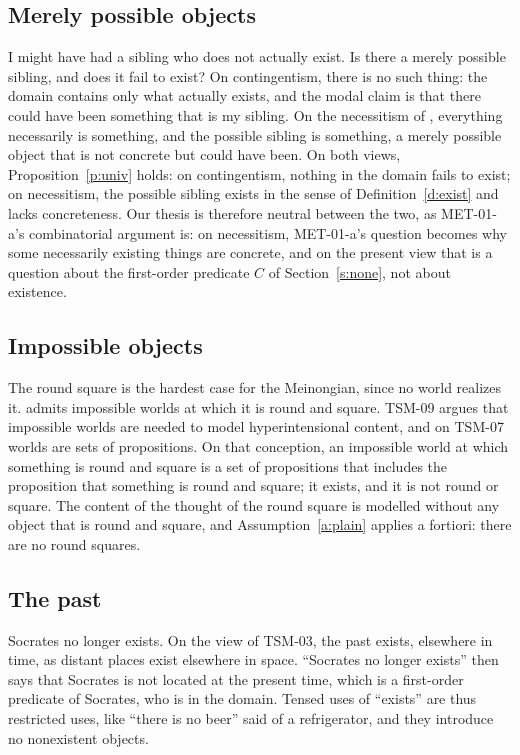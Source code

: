\documentclass{situationist-preprint}
\begin{document}
\subsection{Merely possible objects}

I might have had a sibling who does not actually exist. Is there a merely possible sibling, and does it fail to exist? On contingentism, there is no such thing: the domain contains only what actually exists, and the modal claim is that there could have been something that is my sibling. On the necessitism of \citet{Williamson2013}, everything necessarily is something, and the possible sibling is something, a merely possible object that is not concrete but could have been. On both views, Proposition~\ref{p:univ} holds: on contingentism, nothing in the domain fails to exist; on necessitism, the possible sibling exists in the sense of Definition~\ref{d:exist} and lacks concreteness. Our thesis is therefore neutral between the two, as MET-01-a's combinatorial argument is: on necessitism, MET-01-a's question becomes why some necessarily existing things are concrete, and on the present view that is a question about the first-order predicate $C$ of Section~\ref{s:none}, not about existence.

\subsection{Impossible objects}

The round square is the hardest case for the Meinongian, since no world realizes it. \citet{Priest2005} admits impossible worlds at which it is round and square. TSM-09 argues that impossible worlds are needed to model hyperintensional content, and on TSM-07 worlds are sets of propositions. On that conception, an impossible world at which something is round and square is a set of propositions that includes the proposition that something is round and square; it exists, and it is not round or square. The content of the thought of the round square is modelled without any object that is round and square, and Assumption~\ref{a:plain} applies a fortiori: there are no round squares.

\subsection{The past}

Socrates no longer exists. On the view of TSM-03, the past exists, elsewhere in time, as distant places exist elsewhere in space. \enquote{Socrates no longer exists} then says that Socrates is not located at the present time, which is a first-order predicate of Socrates, who is in the domain. Tensed uses of \enquote{exists} are thus restricted uses, like \enquote{there is no beer} said of a refrigerator, and they introduce no nonexistent objects.
\end{document}
